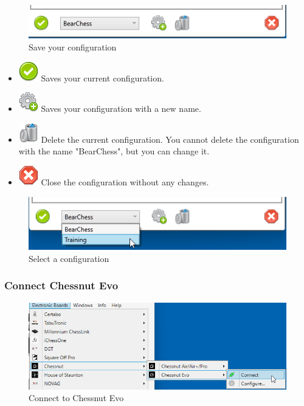 \documentclass[11pt,a4paper]{article}
\begin{document}
\begin{figure}[H]
	\centering
	\includegraphics[scale=1.0]{iChessOne7.png}
	\caption{Save your configuration}
	\label{fig:Chessnut10}
\end{figure}

\begin{itemize}
	\item \includegraphics[scale=0.3]{accept_button.png} Saves your current configuration.
	\item \includegraphics[scale=0.3]{cog_add.png} Saves your configuration with a new name.
	\item \includegraphics[scale=0.3]{bin.png} Delete the current configuration. You cannot delete the configuration with the name "BearChess", but you can change it.
	\item \includegraphics[scale=0.3]{cancel.png} Close the configuration without any changes.
\end{itemize}


\begin{figure}[H]
	\centering
	\includegraphics[scale=1.0]{iChessOne8.png}
	\caption{Select a configuration}
	\label{fig:ChessnnutEvo11}
\end{figure}

\subsubsection{Connect Chessnut Evo} \label{ConnectChessnutEvo}
\begin{figure}[H]
	\centering
	\includegraphics[scale=0.7]{ChessnutEvo1.png}
	\caption{Connect to Chessnut Evo}
	\label{fig:ChessnutEvo1}
\end{figure}
\end{document}
